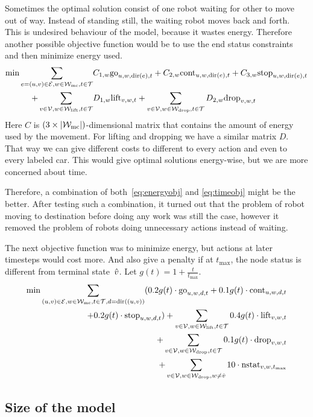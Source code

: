 Sometimes the optimal solution consist of one robot waiting for other to move
out of way. Instead of standing still, the waiting robot moves back and forth.
This is undesired behaviour of the model, because it wastes energy. Therefore
another possible objective function would be to use the end status constraints
and then minimize energy used.
\begin{align}
    \begin{split}
        \label{eq:energyobj}
        \min \sum_{e=(u,v) \in \mathcal{E},w \in \mathcal{W}_\mathrm{mc},t \in \mathcal{T}}
        &C_{1,w} \mathrm{go}_{u,w,\mathrm{dir}(e),t} + C_{2,w} \mathrm{cont}_{u,w,\mathrm{dir}(e),t} + C_{3,w}
        \mathrm{stop}_{u,w,\mathrm{dir}(e),t}\\
        +\sum_{v \in \mathcal{V}, w \in \mathcal{W}_\mathrm{lift},t \in \mathcal{T}} &D_{1,w} \mathrm{lift}_{v,w,t}
        +\sum_{v \in \mathcal{V}, w \in \mathcal{W}_\mathrm{drop},t \in \mathcal{T}} D_{2,w} \mathrm{drop}_{v,w,t}
    \end{split}
\end{align}
Here $C$ is $(3 \times |\mathcal{W}_\mathrm{mc}|)$-dimensional matrix that contains the amount of
energy used by the movement. For lifting and dropping we have a similar matrix
$D$. That way we can give different costs to different to every action and even
to every labeled car. This would give optimal solutions energy-wise,
but we are more concerned about time.

Therefore, a combination of both~\eqref{eq:energyobj} and \eqref{eq:timeobj}
might be the better. After testing such a combination, it turned out that the
problem of robot moving to destination before doing any work was still the
case, however it removed the problem of robots doing unnecessary
actions instead of waiting.

The next objective function was to minimize energy, but actions at later
timesteps would cost more. And also give a penalty if at $t_{\max}$, the node
status is different from terminal state~$\hat{v}$. Let $g(t) = 1 +
\frac{t}{t_{\max}}$.
\begin{align}
    \begin{split}
        \min \sum_{(u,v) \in \mathcal{E},w \in \mathcal{W}_\mathrm{mc},t \in \mathcal{T},d=\mathrm{dir}((u,v))}(0.2 g(t) \cdot
        \mathrm{go}_{u,w,d,t} + 0.1 g(t) \cdot \mathrm{cont}_{u,w,d,t}\\ + 0.2 g(t)
        \cdot \mathrm{stop}_{u,w,d,t})
        +\sum_{v \in \mathcal{V}, w \in \mathcal{W}_\mathrm{lift},t \in \mathcal{T}} 0.4 g(t) \cdot \mathrm{lift}_{v,w,t}\\
        +\sum_{v \in \mathcal{V}, w \in \mathcal{W}_\mathrm{drop},t \in \mathcal{T}} 0.1 g(t) \cdot \mathrm{drop}_{v,w,t}\\
        +\sum_{v \in \mathcal{V}, w \in \mathcal{W}_\mathrm{drop}, w \neq \hat{v}} 10 \cdot
        \mathrm{nstat}_{v,w,t_{\max}}
    \end{split}
\end{align}

\subsection{Size of the model}
